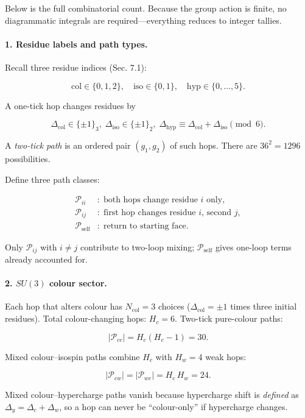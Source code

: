 \documentclass[11pt]{article}
\begin{document}
Below is the full combinatorial count.  Because the group action is
finite, no diagrammatic integrals are required—everything reduces to
integer tallies.

\bigskip
\paragraph{1.  Residue labels and path types.}

Recall three residue indices (Sec. 7.1):

\[
\text{col}\in\{0,1,2\},\quad
\text{iso}\in\{0,1\},\quad
\text{hyp}\in\{0,\dots,5\}.
\]

A one-tick hop changes residues by

\[
\Delta_{\text{col}}\in\{\pm1\}_{\!\!3},\;
\Delta_{\text{iso}}\in\{\pm1\}_{\!\!2},\;
\Delta_{\text{hyp}}\equiv\Delta_{\text{col}}+\Delta_{\text{iso}}\pmod 6.
\]

A \textit{two-tick path} is an ordered pair $(g_1,g_2)$ of such hops.  
There are $36^2=1296$ possibilities.

\smallskip
Define three path classes:

\[
\begin{aligned}
\mathcal P_{ii}&:\; \text{both hops change residue $i$ only},\\
\mathcal P_{ij}&:\; \text{first hop changes residue $i$, second $j$},\\
\mathcal P_\text{self}&:\; \text{return to starting face}.
\end{aligned}
\]

Only $\mathcal P_{ij}$ with $i\neq j$ contribute to two-loop mixing;  
$\mathcal P_\text{self}$ gives one-loop terms already accounted for.

\bigskip
\paragraph{2.  $SU(3)$ colour sector.}

Each hop that alters colour has $N_\text{col}=3$ choices
($\Delta_{\text{col}}=\pm1$ times three initial residues).  
Total colour-changing hops: $H_c=6$.  
Two-tick pure-colour paths:

\[
|\mathcal P_{cc}| = H_c(H_c-1) = 30.
\]

Mixed colour–isospin paths combine $H_c$ with $H_w=4$ weak hops:

\[
|\mathcal P_{cw}| = |\mathcal P_{wc}| = H_c\,H_w = 24.
\]

Mixed colour–hypercharge paths vanish because hypercharge shift is
\textit{defined} as $\Delta_y=\Delta_c+\Delta_w$, so a hop can never be
“colour-only” if hypercharge changes.
\end{document}
